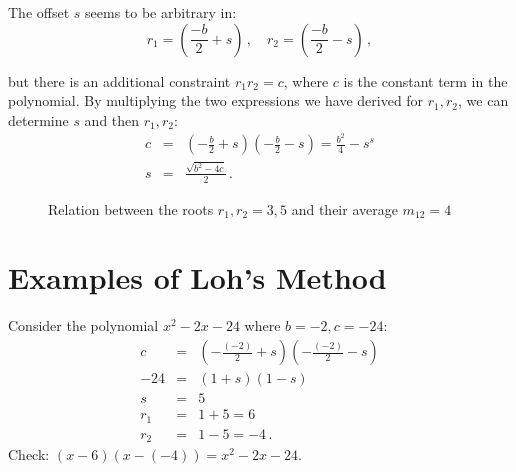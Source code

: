 The offset $s$ seems to be arbitrary in:
\[
r_1=\left(\frac{-b}{2}+s\right)\,,\quad r_2=\left(\frac{-b}{2}-s\right)\,,
\]

\enlargethispage{\baselineskip}

\noindent{}but there is an additional constraint $r_1r_2=c$, where $c$ is the constant term in the polynomial.
By multiplying the two expressions we have derived for $r_1,r_2$, we can determine $s$ and then $r_1,r_2$:
\begin{eqnarray*}
c&=&\left(-\frac{b}{2} +s\right)\left(-\frac{b}{2} -s\right)=
  \frac{b^2}{4}-s^s\\
s&=&\frac{\sqrt{b^2-4c}}{2}\,.
\end{eqnarray*}

\begin{figure}[t]
\begin{center}
\end{center}
\caption{Relation between the roots $r_1,r_2=3,5$ and their average $m_{12}=4$}
\label{f.loh-roots2}
\end{figure}

\section{Examples of Loh's Method}\label{s.examples}

\begin{example}
Consider the polynomial  $x^2-2x-24$ where $b=-2,c=-24$:
\begin{eqnarray*}
c&=&\left(-\frac{(-2)}{2} +s\right)\left(-\frac{(-2)}{2} -s\right)\\
-24&=&(1 +s)(1 -s)\\
s&=&5\\
r_1&=&1+5=6\\
r_2&=&1-5=-4\,.
\end{eqnarray*}
Check: $(x-6)(x-(-4))= x^2-2x-24$.
\end{example}

